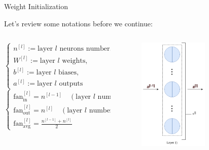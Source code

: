 \documentclass[compress,oilve,t]{beamer}
\begin{document}
\begin{frame}{Weight Initialization}
	\begin{block}{Let's review some notations before we continue:}
		\begin{columns}
			\begin{column}{0.4\textwidth}
				\[
				\begin{cases}
					n^{[l]} := \text{layer $l$ neurons number}, \\[0.5em]
					W^{[l]} := \text{layer $l$ weights},\\[0.5em]
					b^{[l]} := \text{layer $l$ biases},\\[0.5em]
					a^{[l]} := \text{layer $l$ outputs}
				\end{cases}
				\]
				\[
				\begin{cases}
					\text{fan}_\text{in}^{[l]} = n^{[l-1]} \quad (\text{layer $l$ number of inputs}),\\[0.6em]
					\text{fan}_\text{out}^{[l]} = n^{[l]} \quad (\text{layer $l$ number of outputs}),\\[0.6em]
					\text{fan}_\text{avg}^{[l]} = \frac{n^{[l-1]} + n^{[l]}}{2}
				\end{cases}
				\]
			\end{column}\hfill
			\begin{column}{0.4\textwidth}
				\begin{figure}[H]
					\centering	\includegraphics[width=0.65\textwidth]{Figs/notation_review.png}
				\end{figure}
			\end{column}
		\end{columns}
	\end{block}
\end{frame}
\end{document}
